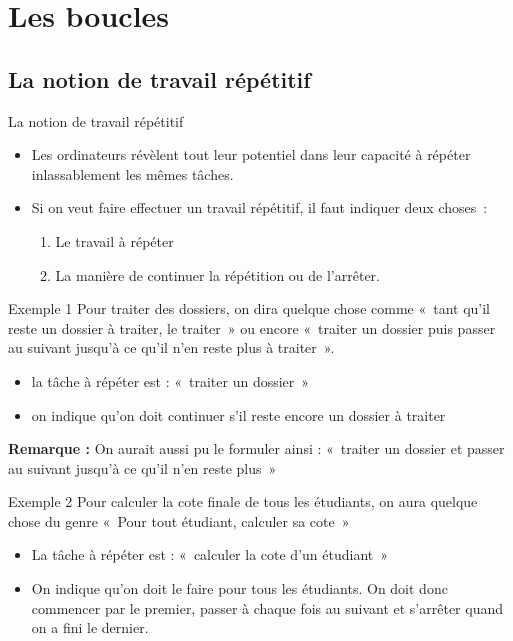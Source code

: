 \section{Les boucles}

\subsection{La notion de travail répétitif}

\begin{frame}{La notion de travail répétitif}
	\begin{itemize}
		\item
		Les ordinateurs révèlent tout leur potentiel dans leur capacité à
		répéter inlassablement les mêmes tâches. 
	\item
		Si on veut faire effectuer un travail répétitif, 
		il faut indiquer deux choses~:
		
		\begin{enumerate}
			\item Le travail à répéter
			\item La manière de continuer la répétition 
				ou de l'arrêter.
		\end{enumerate}

	\end{itemize}
\end{frame}

\begin{frame}{Exemple 1}
	Pour traiter des dossiers, on dira quelque chose
	comme «~tant qu'il reste un dossier à traiter, le
	traiter~» ou encore «~traiter un dossier puis passer au suivant
	jusqu'à ce qu'il n'en reste plus à traiter~».

	\begin{itemize}
	\item la tâche à répéter est : «~traiter un dossier~»
	\item on indique qu'on doit continuer s'il
		reste encore un dossier à traiter
	\end{itemize}
	
	\bigskip

	\textbf{Remarque :} On aurait aussi pu le formuler ainsi : «~traiter un
	dossier et passer au suivant jusqu'à ce
	qu'il n'en reste plus~»
\end{frame}

\begin{frame}{Exemple 2}
	Pour calculer la cote finale de tous les étudiants,
	on aura quelque chose du genre «~Pour tout étudiant, calculer sa
	cote~»

	\begin{itemize}
	\item 
		La tâche à répéter est : «~calculer la cote d'un
		étudiant~»
	\item 
		On indique qu'on doit le faire pour tous les étudiants.
		On doit donc commencer par le premier, passer à chaque fois au suivant
		et s'arrêter quand on a fini le dernier.
	\end{itemize}
\end{frame}

